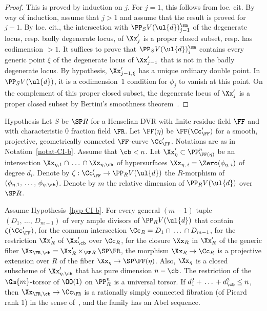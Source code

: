 \begin{proof}
This is proved by induction on $j$. For $j=1$, this follows from loc. cit. By way of induction, assume that $j>1$ and assume that the result is proved for $j-1$. By loc. cit., the intersection with $\PP_S V(\ul{d})^{\sm}_{j-1}$ of the degenerate locus, resp. badly degenerate locus, of $\Xx'_j$ is a proper closed subset, resp. has codimension $>1$. It suffices to prove that $\PP_S V(\ul{d})^{\sm}_j$ contains every generic point $\xi$ of the degenerate locus of $\Xx'_{j-1}$ that is not in the badly degenerate locus. By hypothesis, $\Xx'_{j-1,\xi}$ has a unique ordinary double point. In $\PP_S V(\ul{d})$, it is a codimension~$1$ condition for $\phi_j$ to vanish at this point. On the complement of this proper closed subset, the degenerate locus of $\Xx'_j$ is a proper closed subset by Bertini's smoothness theorem~\cite[Theorème~6.3$\MK$(2)]{Jou}.
\end{proof}

\begin{enonce}
{Hypothesis} \label{hyp-CI-b}
Let $S$ be $\SP R$ for a Henselian DVR with finite residue field $\FF$ and with characteristic $0$ fraction field $\FR$. Let $\FF(\eta)$ be $\FF(\Cc'_{\FF})$ for a smooth, projective, geometrically connected $\FF$-curve $\Cc'_{\FF}$. Notations are as in Notation~\ref{notat-CI-b}. Assume that $\cb<n$. Let $\Xx'_\eta \subset
\PP^n_{\FF(\eta)}$ be an intersection $\Xx_{\eta,1}\cap\,\dots\,
\cap \Xx_{\eta,\cb}$ of hypersurfaces $\Xx_{\eta,\,i}=\Zero(\phi_{\eta,\,i})$ of degree $d_i$. Denote by $\zeta:\Cc'_{\FF}\to \PP_R V(\ul{d})$ the $R$-morphism of $(\phi_{\eta,1},\,\dots,\,\phi_{\eta,\cb})$. Denote by $m$ the relative dimension of $\PP_R V(\ul{d})$ over $\SP R$.
\end{enonce}

\begin{theo}
\cite{DeLand,dJHS} \label{thm-TsenLang}
Assume Hypothesis~\ref{hyp-CI-b}. For every general $(m-1)$-tuple $(D_1,\,\dots,\,D_{m-1})$ of very ample divisors of $\PP_R V(\ul{d})$ that contain $\zeta(\Cc'_{\FF})$, for the common intersection $\Cc_R = D_1\cap \,\dots\,\cap D_{m-1}$, for the restriction $\Xx'_R$ of $\Xx'_\cb$ over $\Cc_R$, for the closure $\Xx_R$ in $\Xx'_R$ of the generic fiber $\Xx_{\FR,\cb} = \Xx'_R\times_{\SP R} \SP \FR$, the morphism $\Xx_R\to \Cc_R$ is a projective extension over $R$ of the fiber $\Xx_\eta \to \SP \FF(\eta)$. Also, $\Xx_\eta$ is a closed subscheme of $\Xx'_{\eta,\cb}$ that has pure dimension $n-\cb$. The restriction of the $\Gm{m}$-torsor of $\OO(1)$ on $\PP^n_R$ is a universal torsor. If $d_1^2 +\,\dots\,+ d_\cb^2 \leq n$, then $\Xx_{\FR,\cb}\to \Cc_{\FR}$ is a rationally simply connected fibration (of Picard rank $1$) in the sense of~\cite[Theorem~13.1]{dJHS}, and the family has an Abel sequence.
\end{theo}

